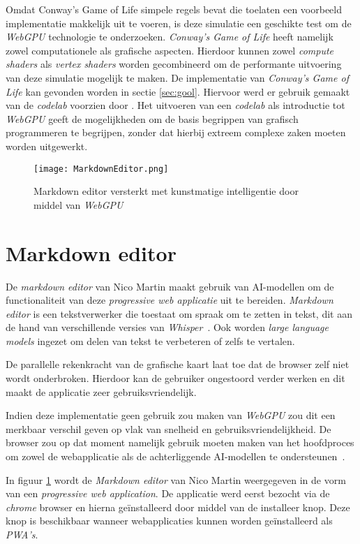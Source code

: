 Omdat Conway's Game of Life simpele regels bevat die toelaten een voorbeeld implementatie makkelijk uit te voeren, is deze simulatie een geschikte test om de \textit{WebGPU} technologie te onderzoeken. \textit{Conway's Game of Life} heeft namelijk zowel computationele als grafische aspecten. Hierdoor kunnen zowel \textit{compute shaders} als \textit{vertex shaders} worden gecombineerd om de performante uitvoering van deze simulatie mogelijk te maken. De implementatie van \textit{Conway's Game of Life} kan gevonden worden in sectie \ref{sec:gool}. Hiervoor werd er gebruik gemaakt van de \textit{codelab} voorzien door \textcite{google2023}. Het uitvoeren van een \textit{codelab} als introductie tot \textit{WebGPU} geeft de mogelijkheden om de basis begrippen van grafisch programmeren te begrijpen, zonder dat hierbij extreem complexe zaken moeten worden uitgewerkt.

\begin{figure}
    \texttt{[image: MarkdownEditor.png]}
    \caption[Markdown editor met AI en \textit{WebGPU}~\autocite{Martin2020}]{
        Markdown editor versterkt met kunstmatige intelligentie door middel van \textit{WebGPU}~\autocite{Martin2020}
    }
    \label{fig:MardownEditor}
\end{figure}

\section{Markdown editor}

De \textit{markdown editor} van Nico Martin maakt gebruik van AI-modellen om de functionaliteit van deze \textit{progressive web applicatie} uit te bereiden. \textit{Markdown editor} is een tekstverwerker die toestaat om spraak om te zetten in tekst, dit aan de hand van verschillende versies van \textit{Whisper}~\autocite{Radford2022}. Ook worden \textit{large language models} ingezet om delen van tekst te verbeteren of zelfs te vertalen. 

\bigbreak{}

De parallelle rekenkracht van de grafische kaart laat toe dat de browser zelf niet wordt onderbroken. Hierdoor kan de gebruiker ongestoord verder werken en dit maakt de applicatie zeer gebruiksvriendelijk.

\bigbreak{}

Indien deze implementatie geen gebruik zou maken van \textit{WebGPU} zou dit een merkbaar verschil geven op vlak van snelheid en gebruiksvriendelijkheid. De browser zou op dat moment namelijk gebruik moeten maken van het hoofdproces om  zowel de webapplicatie als de achterliggende AI-modellen te ondersteunen~\autocite{Martin2020}.

\bigbreak{}

In figuur \ref{fig:MardownEditor} wordt de \textit{Markdown editor} van Nico Martin weergegeven in de vorm van een \textit{progressive web application}. De applicatie werd eerst bezocht via de \textit{chrome} browser en hierna  geïnstalleerd door middel van de installeer knop. Deze knop is beschikbaar wanneer webapplicaties kunnen worden geïnstalleerd als \textit{PWA's}.